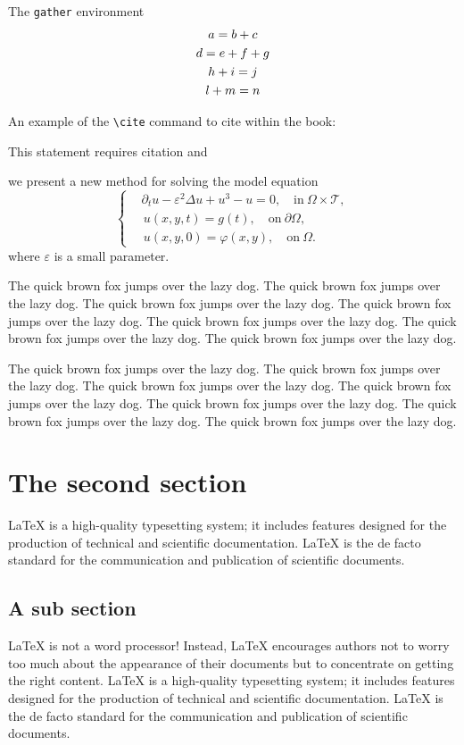 \documentclass[openany,twoside,12pt]{book}
\theoremstyle{plain}
\numberwithin{equation}{chapter}
\numberwithin{figure}{chapter}
\numberwithin{table}{chapter}
\begin{document}
The \texttt{gather} environment
\begin{gather}
a = b + c \\
d = e + f + g \notag \\
h + i = j \\
l + m = n
\end{gather}

An example of the \verb|\cite| command to cite within the book:

This statement requires citation \cite{Adams2003} and \cite{Shen1994,Tadmor2012,TreWei2014}


we present a new method for solving the model equation
\begin{equation}\label{eq:mulequ}
\left\{\begin{aligned}
  & \partial_{t} u-\varepsilon^{2} \Delta u+u^{3}-u=0, \quad \text{in} ~\Omega\times\mathcal{T}, \\
  &\, u(x,y,t) = g(t), \quad \text{on} ~ \partial \Omega, \\
  &\, u(x,y,0)=\varphi(x, y), \quad \text{on} ~\Omega.
\end{aligned}\right.
\end{equation}
where $\varepsilon$ is a small parameter.

The quick brown fox jumps over the lazy dog. The quick brown fox jumps over the lazy dog. The quick brown fox jumps over the lazy dog. The quick brown fox jumps over the lazy dog. The quick brown fox jumps over the lazy dog. The quick brown fox jumps over the lazy dog. The quick brown fox jumps over the lazy dog.

The quick brown fox jumps over the lazy dog. The quick brown fox jumps over the lazy dog. The quick brown fox jumps over the lazy dog. The quick brown fox jumps over the lazy dog. The quick brown fox jumps over the lazy dog. The quick brown fox jumps over the lazy dog. The quick brown fox jumps over the lazy dog.


\section{The second section}
LaTeX is a high-quality typesetting system; it includes features designed for the production of technical and scientific documentation. LaTeX is the de facto standard for the communication and publication of scientific documents.

\subsection{A sub section}
LaTeX is not a word processor! Instead, LaTeX encourages authors not to worry too much about the appearance of their documents but to concentrate on getting the right content. LaTeX is a high-quality typesetting system; it includes features designed for the production of technical and scientific documentation. LaTeX is the de facto standard for the communication and publication of scientific documents.
\end{document}

